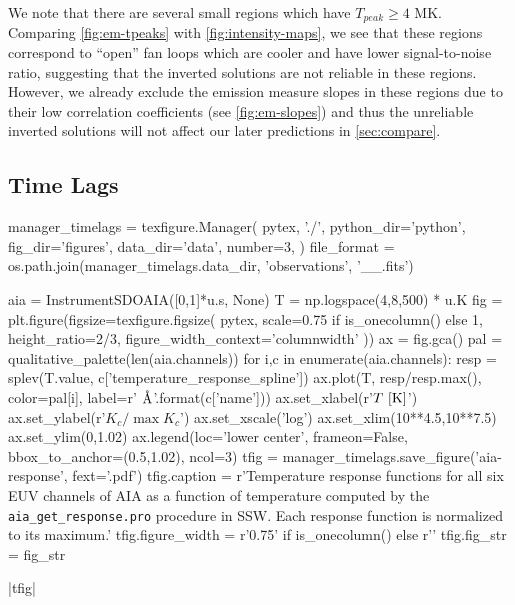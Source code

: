 We note that there are several small regions which have $T_{peak}\ge4$ MK.
Comparing \autoref{fig:em-tpeaks} with \autoref{fig:intensity-maps}, we see that these regions correspond to ``open'' fan loops which are cooler and have lower signal-to-noise ratio, suggesting that the inverted \dem{} solutions are not reliable in these regions.
However, we already exclude the emission measure slopes in these regions due to their low correlation coefficients (see \autoref{fig:em-slopes}) and thus the unreliable inverted solutions will not affect our later predictions in \autoref{sec:compare}.

\subsection{Time Lags}\label{sec:timelags}

\begin{pycode}
manager_timelags = texfigure.Manager(
    pytex, './',
    python_dir='python',
    fig_dir='figures',
    data_dir='data',
    number=3,
)
file_format = os.path.join(manager_timelags.data_dir, 'observations', '{}_{}_{}.fits')
\end{pycode}

\begin{pycode}
aia = InstrumentSDOAIA([0,1]*u.s, None)
T = np.logspace(4,8,500) * u.K
fig = plt.figure(figsize=texfigure.figsize(
    pytex,
    scale=0.75 if is_onecolumn() else 1,
    height_ratio=2/3,
    figure_width_context='columnwidth'
))
ax = fig.gca()
pal = qualitative_palette(len(aia.channels))
for i,c in enumerate(aia.channels):
    resp = splev(T.value, c['temperature_response_spline'])
    ax.plot(T, resp/resp.max(), color=pal[i], label=r'{} $\textup{{\AA}}$'.format(c['name']))
ax.set_xlabel(r'$T\,\,[\textup{K}]$')
ax.set_ylabel(r'$K_c/\max{K_c}$')
ax.set_xscale('log')
ax.set_xlim(10**4.5,10**7.5)
ax.set_ylim(0,1.02)
ax.legend(loc='lower center', frameon=False, bbox_to_anchor=(0.5,1.02), ncol=3)
tfig = manager_timelags.save_figure('aia-response', fext='.pdf')
tfig.caption = r'Temperature response functions for all six EUV channels of AIA as a function of temperature computed by the \texttt{aia\_get\_response.pro} procedure in SSW. Each response function is normalized to its maximum.'
tfig.figure_width = r'0.75\columnwidth' if is_onecolumn() else r'\columnwidth'
tfig.fig_str = fig_str
\end{pycode}
|tfig|

